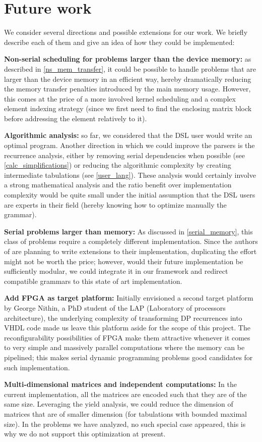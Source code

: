 \documentclass[11pt]{article}
\begin{document}
\section{Future work}
We consider several directions and possible extensions for our work. We briefly describe each of them and give an idea of how they could be implemented:\ol
\item \textbf{Non-serial scheduling for problems larger than the device memory:} as described in \ref{ns_mem_transfer}, it could be possible to handle problems that are larger than the device memory in an efficient way, hereby dramatically reducing the memory transfer penalties introduced by the main memory usage. However, this comes at the price of a more involved kernel scheduling and a complex element indexing strategy (since we first need to find the enclosing matrix block before addressing the element relatively to it).
\item \textbf{Algorithmic analysis:} so far, we considered that the DSL user would write an optimal program. Another direction in which we could improve the parsers is the recurrence analysis, either by removing serial dependencies when possible (see \ref{calc_simplifications}) or reducing the algorithmic complexity by creating intermediate tabulations (see \ref{user_lang}). These analysis would certainly involve a strong mathematical analysis and the ratio benefit over implementation complexity would be quite small under the initial assumption that the DSL users are experts in their field (hereby knowing how to optimize manually the grammar). 
\item \textbf{Serial problems larger than memory:} As discussed in \ref{serial_memory}, this class of problems require a completely different implementation. Since the authors of \cite{swat_mega} are planning to write extensions to their implementation, duplicating the effort might not be worth the price; however, would their future implementation be sufficiently modular, we could integrate it in our framework and redirect compatible grammars to this state of art implementation.
\item \textbf{Add FPGA as target platform:} Initially envisioned a second target platform by George Nithin, a PhD student of the LAP (Laboratory of processors architecture), the underlying complexity of transforming DP recurrences into VHDL code made us leave this platform aside for the scope of this project. The reconfigurability possibilities of FPGA make them attractive whenever it comes to very simple and massively parallel computations where the memory can be pipelined; this makes serial dynamic programming problems good candidates for such implementation.
\item \textbf{Multi-dimensional matrices and independent computations:} In the current implementation, all the matrices are encoded such that they are of the same size. Leveraging the yield analysis, we could reduce the dimension of matrices that are of smaller dimension (for tabulations with bounded maximal size). In the problems we have analyzed, no such special case appeared, this is why we do not support this optimization at present.
\end{document}
